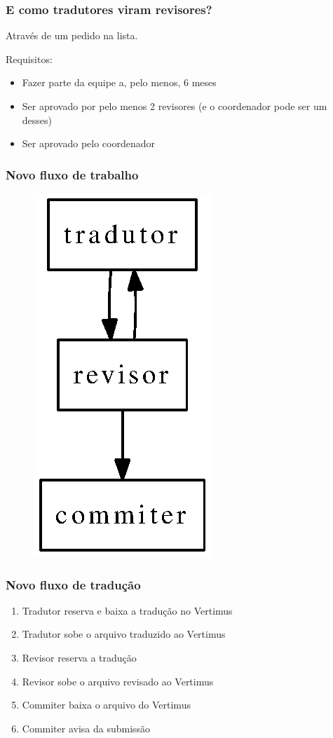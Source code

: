 \documentclass{beamer}
\begin{document}
\begin{frame}
    \frametitle{E como tradutores viram revisores?}
    Através de um pedido na lista.

    Requisitos:
    \begin{itemize}[<+->]
        \item Fazer parte da equipe a, pelo menos, 6 meses
        \item Ser aprovado por pelo menos 2 revisores (e o coordenador pode ser um desses)
        \item Ser aprovado pelo coordenador
    \end{itemize}
\end{frame}

\begin{frame}
    \frametitle{Novo fluxo de trabalho}
    \begin{figure}[ht]
        \includegraphics{figures/fluxo_novo.eps}     
    \end{figure}
\end{frame}

\begin{frame}
    \frametitle[Vertimus]{Novo fluxo de tradução}
    \begin{enumerate}[<+->]
        \item Tradutor reserva e baixa a tradução no Vertimus
        \item Tradutor sobe o arquivo traduzido ao Vertimus
        \item Revisor reserva a tradução
        \item Revisor sobe o arquivo revisado ao Vertimus
        \item Commiter baixa o arquivo do Vertimus
        \item Commiter avisa da submissão
    \end{enumerate}
\end{frame}
\end{document}
